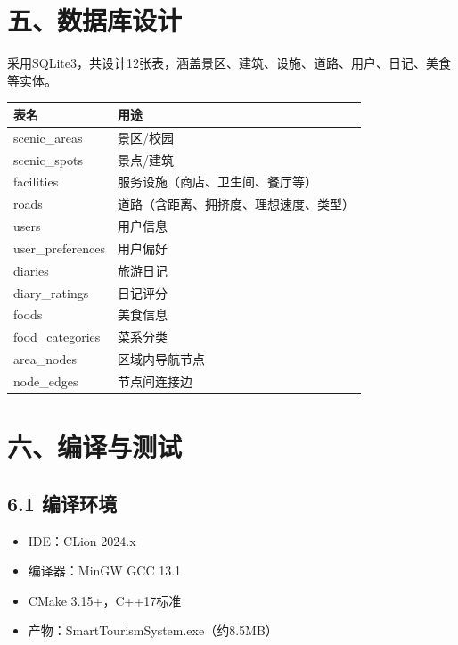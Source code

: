 \documentclass[12pt,a4paper]{article}
\begin{document}
\section*{五、数据库设计}

采用SQLite3，共设计12张表，涵盖景区、建筑、设施、道路、用户、日记、美食等实体。

\begin{center}
\begin{tabular}{l l}
    \toprule
    表名 & 用途 \\
    \midrule
    scenic\_areas    & 景区/校园 \\
    scenic\_spots    & 景点/建筑 \\
    facilities       & 服务设施（商店、卫生间、餐厅等） \\
    roads            & 道路（含距离、拥挤度、理想速度、类型） \\
    users            & 用户信息 \\
    user\_preferences & 用户偏好 \\
    diaries          & 旅游日记 \\
    diary\_ratings   & 日记评分 \\
    foods            & 美食信息 \\
    food\_categories & 菜系分类 \\
    area\_nodes      & 区域内导航节点 \\
    node\_edges      & 节点间连接边 \\
    \bottomrule
\end{tabular}
\end{center}

\section*{六、编译与测试}

\subsection*{6.1 编译环境}

\begin{itemize}[leftmargin=2em]
    \item IDE：CLion 2024.x
    \item 编译器：MinGW GCC 13.1
    \item CMake 3.15+，C++17标准
    \item 产物：SmartTourismSystem.exe（约8.5MB）
\end{itemize}
\end{document}
